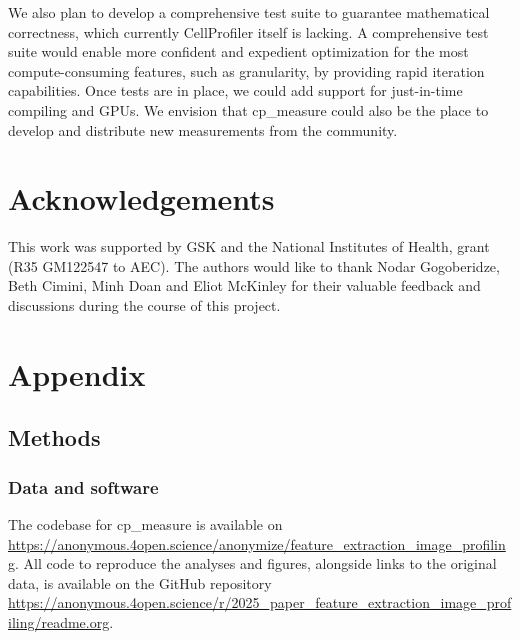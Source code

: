 \documentclass{article}
\begin{document}
We also plan to develop a comprehensive test suite to guarantee mathematical correctness, which currently CellProfiler itself is lacking. A comprehensive test suite would enable more confident and expedient optimization for the most compute-consuming features, such as granularity, by providing rapid iteration capabilities. Once tests are in place, we could add support for just-in-time compiling and GPUs. We envision that cp\_measure could also be the place to develop and distribute new measurements from the community. 




\onecolumn
\section{Acknowledgements}
\label{sec:acknowledgements}

This work was supported by GSK and the National Institutes of Health, grant (R35 GM122547 to AEC). The authors would like to thank Nodar Gogoberidze, Beth Cimini, Minh Doan and Eliot McKinley for their valuable feedback and discussions during the course of this project.

\section{Appendix}

\appendix
\setcounter{figure}{0}
\renewcommand{\thefigure}{A\arabic{figure}}

\setcounter{section}{5}
\renewcommand{\thesection}{\arabic{section}}
\renewcommand{\thesubsection}{\thesection.\arabic{subsection}}
\renewcommand{\thesubsubsection}{\thesubsection.\arabic{subsubsection}}


\label{sec:orgdd18dd8}
\subsection{Methods}
\label{sec:orgb3e9382}
\subsubsection{Data and software}
\label{sec:orgbda0ae2}
The codebase for cp\_measure is available on \url{https://anonymous.4open.science/anonymize/feature_extraction_image_profiling}. All code to reproduce the analyses and figures, alongside links to the original data, is available on the GitHub repository \url{https://anonymous.4open.science/r/2025_paper_feature_extraction_image_profiling/readme.org}. 
% 
\end{document}
